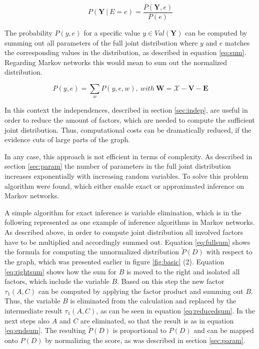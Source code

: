 \begin{equation}
P(\mathbf{Y}\ |\ E=e)=\frac{P(\mathbf{Y},e)}{P(e)}
\end{equation}

The probability $P(y,e)$ for a specific value $y \in Val(\mathbf{Y})$ can be computed by summing out all parameters of the full joint distribution where $y$ and $e$ matches the corresponding values in the distribution, as described in equation \ref{eq:sum}. Regarding Markov networks this would mean to sum out the normalized distribution.

\begin{equation}
P(y,e)=\sum_w{P(y,e,w)},\ with\ \mathbf{W} = \mathcal{X} - \mathbf{V} - \mathbf{E}
\label{eq:sum}
\end{equation}

In this context the independences, described in section \ref{sec:indep}, are useful in order to reduce the amount of factors, which are needed to compute the sufficient joint distribution. Thus, computational costs can be dramatically reduced, if the evidence cuts of large parts of the graph.

In any case, this approach is not efficient in terms of complexity. As described in section \ref{sec:param} the number of parameters in the full joint distribution increases exponentially with increasing random variables. To solve this problem algorithm were found, which either enable exact or approximated inference on Markov networks.

A simple algorithm for exact inference is variable elimination, which is in the following represented as one example of inference algorithms in Markov networks. As described above, in order to compute joint distribution all involved factors have to be multiplied and accordingly summed out. Equation \ref{eq:fullsum} shows the formula for computing the unnormalized distribution $\widetilde{P}(D)$ with respect to the graph, which was presented earlier in figure \ref{fig:basic} (2). Equation \ref{eq:rightsum} shows how the sum for $B$ is moved to the right and isolated all factors, which include the variable $B$. Based on this step the new factor $\tau_1(A,C)$ can be computed by applying the factor product and summing out $B$. Thus, the variable $B$ is eliminated from the calculation and replaced by the intermediate result $\tau_1(A,C)$, as can be seen in equation \ref{eq:reducedsum}. In the next steps also $A$ and $C$ are eliminated, so that the result is as in equation \ref{eq:endsum}. The resulting $\widetilde{P}(D)$ is proportional to $P(D)$ and can be mapped onto $P(D)$ by normalizing the score, as was described in section \ref{sec:param}.

